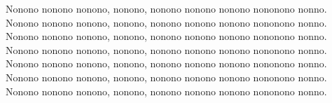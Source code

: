\begin{resumo}
	Nonono nonono nonono, nonono, nonono nonono nonono nononono nonno.
	Nonono nonono nonono, nonono, nonono nonono nonono nononono nonno.
	Nonono nonono nonono, nonono, nonono nonono nonono nononono nonno.
	Nonono nonono nonono, nonono, nonono nonono nonono nononono nonno.
	Nonono nonono nonono, nonono, nonono nonono nonono nononono nonno.
	Nonono nonono nonono, nonono, nonono nonono nonono nononono nonno.
	Nonono nonono nonono, nonono, nonono nonono nonono nononono nonno.


\end{resumo}
